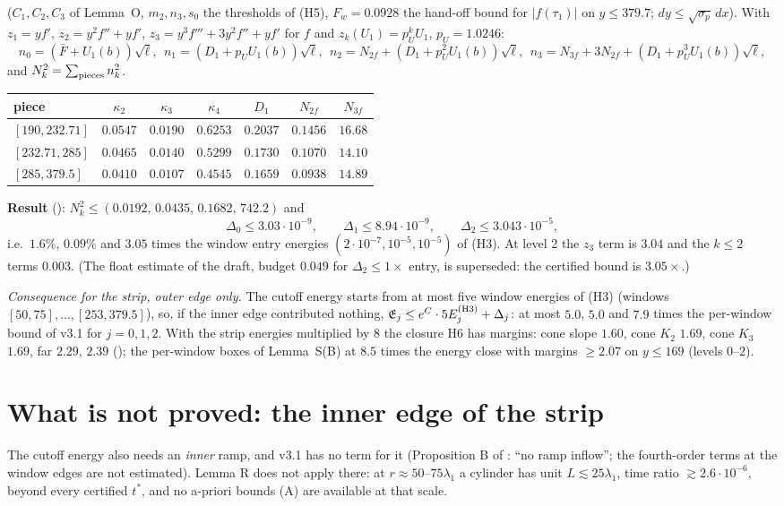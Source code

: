 \documentclass[11pt]{article}
\begin{document}
($C_1,C_2,C_3$ of Lemma~O, $m_2,n_3,s_0$ the thresholds of (H5), $F_w=0.0928$ the hand-off bound for $|f(\tau_1)|$ on $y\le379.7$; $dy\le\sqrt{\sigma_p}\,dx$). With $z_1=yf'$, $z_2=y^2f''+yf'$, $z_3=y^3f'''+3y^2f''+yf'$ for $f$ and $z_k(U_1)=p_U^kU_1$, $p_U=1.0246$:
\[n_0=(\bar F+U_1(b))\sqrt\ell,\ \ n_1=(D_1+p_UU_1(b))\sqrt\ell,\ \ n_2=N_{2f}+(D_1+p_U^2U_1(b))\sqrt\ell,\ \ n_3=N_{3f}+3N_{2f}+(D_1+p_U^3U_1(b))\sqrt\ell,\]
and $N_k^2=\sum_{\rm pieces}n_k^2$.
\begin{center}\small\begin{tabular}{lcccccc}\toprule
piece & $\kappa_2$ & $\kappa_3$ & $\kappa_4$ & $D_1$ & $N_{2f}$ & $N_{3f}$\\\midrule
$[190,232.71]$ & $0.0547$ & $0.0190$ & $0.6253$ & $0.2037$ & $0.1456$ & $16.68$\\
$[232.71,285]$ & $0.0465$ & $0.0140$ & $0.5299$ & $0.1730$ & $0.1070$ & $14.10$\\
$[285,379.5]$ & $0.0410$ & $0.0107$ & $0.4545$ & $0.1659$ & $0.0938$ & $14.89$\\\bottomrule
\end{tabular}\end{center}
\textbf{Result} (): $N_k^2\le(0.0192,\,0.0435,\,0.1682,\,742.2)$ and
\[\Delta_0\le3.03\cdot10^{-9},\qquad\Delta_1\le8.94\cdot10^{-9},\qquad\Delta_2\le3.043\cdot10^{-5},\]
i.e.\ $1.6\%$, $0.09\%$ and $3.05$ times the window entry energies $(2\cdot10^{-7},10^{-5},10^{-5})$ of (H3). At level 2 the $z_3$ term is $3.04$ and the $k\le2$ terms $0.003$. (The float estimate of the draft, budget $0.049$ for $\Delta_2\le1\times$ entry, is superseded: the certified bound is $3.05\times$.)

\emph{Consequence for the strip, outer edge only.} The cutoff energy starts from at most five window energies of (H3) (windows $[50,75],\dots,[253,379.5]$), so, if the inner edge contributed nothing,
$\mathfrak E_j\le e^{C}\cdot5E_j^{\rm (H3)}+\Delta_j$: at most $5.0$, $5.0$ and $7.9$ times the per-window bound of v3.1 for $j=0,1,2$. With the strip energies multiplied by $8$ the closure H6 has margins: cone slope $1.60$, cone $K_2$ $1.69$, cone $K_3$ $1.69$, far $2.29$, $2.39$ (); the per-window boxes of Lemma~S(B) at $8.5$ times the energy close with margins $\ge2.07$ on $y\le169$ (levels $0$--$2$).

\section{What is not proved: the inner edge of the strip}\label{sec:inner}
The cutoff energy also needs an \emph{inner} ramp, and v3.1 has no term for it (Proposition B of : ``no ramp inflow''; the fourth-order terms at the window edges are not estimated). Lemma R does not apply there: at $r\approx50$--$75\lambda_1$ a cylinder has unit $L\lesssim25\lambda_1$, time ratio $\gtrsim2.6\cdot10^{-6}$, beyond every certified $t^*$, and no a-priori bounds (A) are available at that scale.
\end{document}
